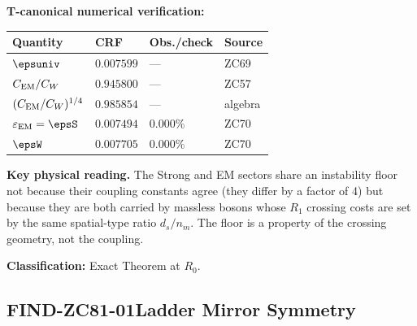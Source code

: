 \documentclass[12pt, a4paper]{article}
\renewcommand{\epsEM}{\varepsilon_{\rm EM}}
\begin{document}
\begin{formalbox}[title={THM-ZC81-01: Strong Floor Identity
  ($R_0$, Exact)}]
\textbf{T-canonical numerical verification:}
\begin{center}
{\small\renewcommand{\arraystretch}{1.25}
\begin{tabular}{@{}p{5.5cm}p{2.2cm}p{2.2cm}l@{}}
\toprule
Quantity & CRF & Obs./check & Source \\
\midrule
$\epsuniv$               & $0.007599$ & --- & ZC69 \\
$C_{\rm EM}/C_W$         & $0.945800$ & --- & ZC57 \\
$(C_{\rm EM}/C_W)^{1/4}$ & $0.985854$ & --- & algebra \\
$\epsEM = \epsS$         & $0.007494$ & $0.000\%$ & ZC70 \\
$\epsW$                  & $0.007705$ & $0.000\%$ & ZC70 \\
\bottomrule
\end{tabular}}
\end{center}

\textbf{Key physical reading.}
The Strong and EM sectors share an instability floor not because
their coupling constants agree (they differ by a factor of 4) but
because they are both carried by massless bosons whose $R_1$
crossing costs are set by the same spatial-type ratio $d_s/n_m$.
The floor is a property of the crossing geometry, not the coupling.

\textbf{Classification:} Exact Theorem at $R_0$.
\end{formalbox}

\subsection{FIND-ZC81-01\quad Ladder Mirror Symmetry}
\label{sec:find01}

\end{document}
